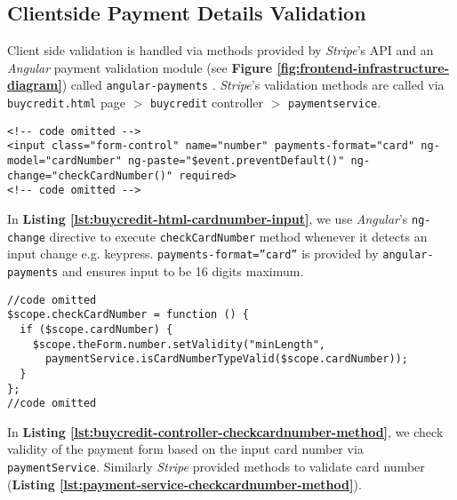 \subsection{Clientside Payment Details Validation}
\label{subsec:clientside-payment-details-validation}

Client side validation is handled via methods provided by \textit{Stripe}’s API and an \textit{Angular} payment validation module  (see \textbf{Figure \ref{fig:frontend-infrastructure-diagram}}) called \texttt{angular-payments} \cite{angularpayments}. \textit{Stripe}’s validation methods are called via \texttt{buycredit.html} page $>$ \texttt{buycredit} controller $>$ \texttt{paymentservice}.

\begin{listing}[H]
\begin{verbatim}
<!-- code omitted -->
<input class="form-control" name="number" payments-format="card" ng-model="cardNumber" ng-paste="$event.preventDefault()" ng-change="checkCardNumber()" required>
<!-- code omitted -->
\end{verbatim}
\label{lst:buycredit-html-cardnumber-input}
\end{listing}

In \textbf{Listing \ref{lst:buycredit-html-cardnumber-input}}, we  use \textit{Angular}’s \texttt{ng-change} directive to execute \texttt{checkCardNumber} method whenever it detects an input change e.g. keypress. \texttt{payments-format=”card”} is provided by \texttt{angular-payments} and ensures input to be 16 digits maximum.\\

\begin{listing}[H]
\begin{verbatim}
//code omitted
$scope.checkCardNumber = function () {
  if ($scope.cardNumber) {
    $scope.theForm.number.setValidity("minLength",
      paymentService.isCardNumberTypeValid($scope.cardNumber));
  }
};
//code omitted
\end{verbatim}
\label{lst:buycredit-controller-checkcardnumber-method}
\end{listing}

In \textbf{Listing \ref{lst:buycredit-controller-checkcardnumber-method}}, we check validity of the payment form based on the input card number via \texttt{paymentService}. Similarly \textit{Stripe} provided methods to validate card number (\textbf{Listing \ref{lst:payment-service-checkcardnumber-method}}).\\

